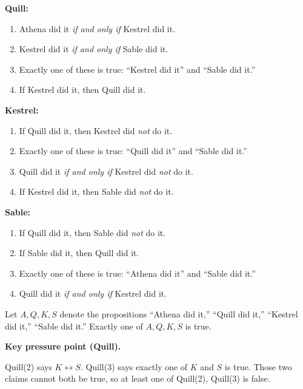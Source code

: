 \medskip

\textbf{Quill:}

\begin{enumerate}[label=(\arabic*)]
\item Athena did it \emph{if and only if} Kestrel did it.
\item Kestrel did it \emph{if and only if} Sable did it.
\item Exactly one of these is true: ``Kestrel did it'' and ``Sable did it.''
\item If Kestrel did it, then Quill did it.
\end{enumerate}

\medskip

\textbf{Kestrel:}

\begin{enumerate}[label=(\arabic*)]
\item If Quill did it, then Kestrel did \emph{not} do it.
\item Exactly one of these is true: ``Quill did it'' and ``Sable did it.''
\item Quill did it \emph{if and only if} Kestrel did \emph{not} do it.
\item If Kestrel did it, then Sable did \emph{not} do it.
\end{enumerate}

\medskip

\textbf{Sable:}

\begin{enumerate}[label=(\arabic*)]
\item If Quill did it, then Sable did \emph{not} do it.
\item If Sable did it, then Quill did it.
\item Exactly one of these is true: ``Athena did it'' and ``Sable did it.''
\item Quill did it \emph{if and only if} Kestrel did it.
\end{enumerate}

\medskip


\SolutionPage

Let \(A,Q,K,S\) denote the propositions ``Athena did it,'' ``Quill did it,'' ``Kestrel did it,'' ``Sable did it.''
Exactly one of \(A,Q,K,S\) is true.

\textbf{Key pressure point (Quill).}

Quill(2) says \(K \leftrightarrow S\).
Quill(3) says exactly one of \(K\) and \(S\) is true.
Those two claims cannot both be true, so at least one of Quill(2), Quill(3) is false.


